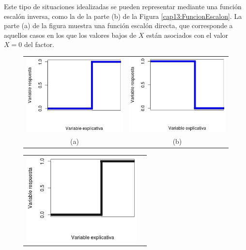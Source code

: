 \noindent Este tipo de situaciones idealizadas se pueden representar mediante una {\sf función escalón inversa}, como la de la parte (b) de la Figura \ref{cap13:FuncionEscalon}.  La parte (a) de la figura muestra una {\sf función escalón directa}, que corresponde a aquellos casos en los que los valores bajos de $X$ están asociados con el valor $X=0$ del factor.
\begin{figure}[htb]
\begin{center}
\begin{enColor}
\begin{tabular}{cc}
	    \includegraphics[width=6cm]{../fig/Cap13-QueEsperarEscalon1.png}&
	    \includegraphics[width=6cm]{../fig/Cap13-QueEsperarEscalon2.png}\\[3mm]
	    (a) &   (b)\\[2mm]
\end{tabular}	
\end{enColor}
\begin{bn}
\begin{tabular}{cc}
	\includegraphics[width=6cm]{../fig/Cap13-QueEsperarEscalon1-bn.png}&

\end{tabular}
\end{bn}
\end{center}
\end{figure}
